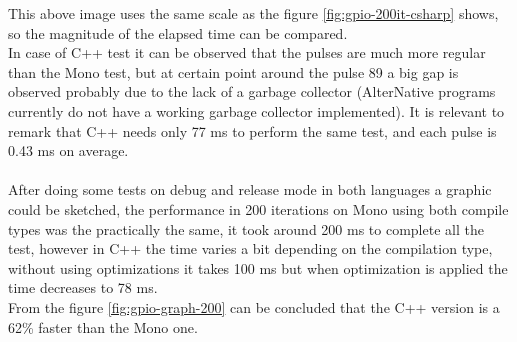 This above image uses the same scale as the figure \ref{fig:gpio-200it-csharp} shows, so the magnitude of the elapsed time can be compared.
\\
In case of C++ test it can be observed that the pulses are much more regular than the Mono test, but at certain point around the pulse 89 a big gap is observed probably due to the lack of a garbage collector (AlterNative programs currently do not have a working garbage collector implemented). It is relevant to remark that C++ needs only 77 ms to perform the same test, and each pulse is 0.43 ms on average.
\\
\\
After doing some tests on debug and release mode in both languages a graphic could be sketched, the performance in 200 iterations on Mono using both compile types was the practically the same, it took around 200 ms to complete all the test, however in C++ the time varies a bit depending on the compilation type, without using optimizations it takes 100 ms but when optimization is applied the time decreases to 78 ms.
\\
From the figure \ref{fig:gpio-graph-200} can be concluded that the C++ version is a 62\% faster than the Mono one.
